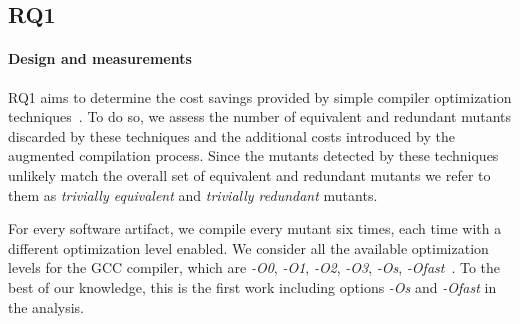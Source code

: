 




%

\subsection{RQ1}




\paragraph{Design and measurements}

RQ1 aims to determine the cost savings provided by simple compiler optimization techniques~\cite{papadakis2015trivial,kintis2017detecting}. To do so, we assess the number of equivalent and redundant mutants discarded by these techniques and the additional costs introduced by the augmented compilation process. Since the mutants detected by these techniques unlikely match the overall set of equivalent and redundant mutants we refer to them as \emph{trivially equivalent} and \emph{trivially redundant} mutants.

For every software artifact, we compile every mutant six times, each time with a different optimization level enabled. We consider all the available optimization levels for the GCC compiler, which are \emph{-O0}, \emph{-O1}, \emph{-O2}, \emph{-O3}, \emph{-Os},
 \emph{-Ofast}~\cite{GCCopt}. To the best of our knowledge, this is the first work including options \emph{-Os} and
 \emph{-Ofast} in the analysis.
 

